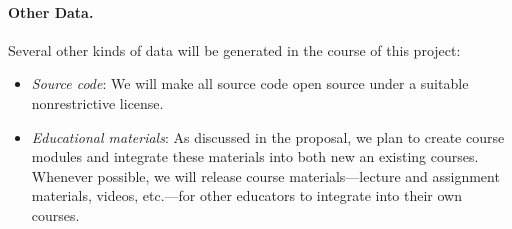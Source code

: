 \paragraph{Other Data.} Several other kinds of data will be generated in the
course of this project:

\begin{itemize}
\item
  \emph{Source code}: We will make all source code open
  source under a suitable nonrestrictive license.
\item
  \emph{Educational materials}: As discussed in the proposal, we plan to
        create course modules and integrate these materials into both new an
        existing courses. Whenever possible, we will release course
        materials---lecture and assignment materials, videos, etc.---for other
        educators to integrate into their own courses.
\end{itemize}
